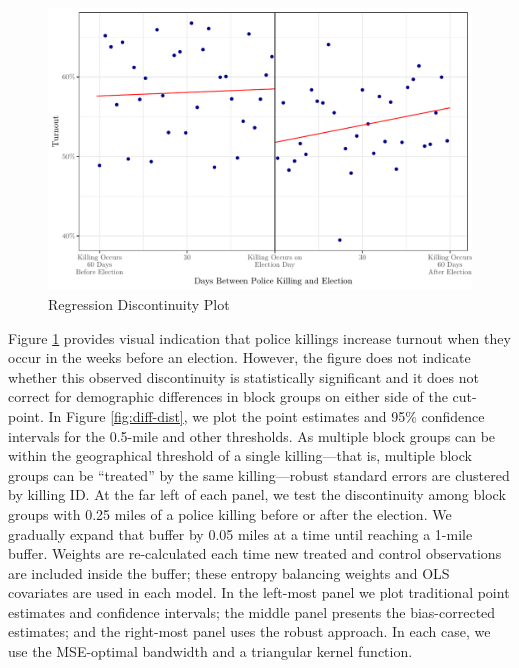 \documentclass[12pt]{article}
\begin{document}
\begin{figure}[!t]

\centering 
\includegraphics[width=\linewidth]{Figures/rd-plot-1} 
\caption{Regression Discontinuity Plot}
\label{fig:rdplot}

\end{figure}

Figure \ref{fig:rdplot} provides visual indication that police killings increase turnout when they occur in the weeks before an election. However, the figure does not indicate whether this observed discontinuity is statistically significant and it does not correct for demographic differences in block groups on either side of the cut-point. In Figure \ref{fig:diff-dist}, we plot the point estimates and 95\% confidence intervals for the 0.5-mile and other thresholds. As multiple block groups can be within the geographical threshold of a single killing---that is, multiple block groups can be ``treated'' by the same killing---robust standard errors are clustered by killing ID. At the far left of each panel, we test the discontinuity among block groups with 0.25 miles of a police killing before or after the election. We gradually expand that buffer by 0.05 miles at a time until reaching a 1-mile buffer. Weights are re-calculated each time new treated and control observations are included inside the buffer; these entropy balancing weights and OLS covariates are used in each model. In the left-most panel we plot traditional point estimates and confidence intervals; the middle panel presents the bias-corrected estimates; and the right-most panel uses the robust approach. In each case, we use the MSE-optimal bandwidth and a triangular kernel function.
\end{document}
